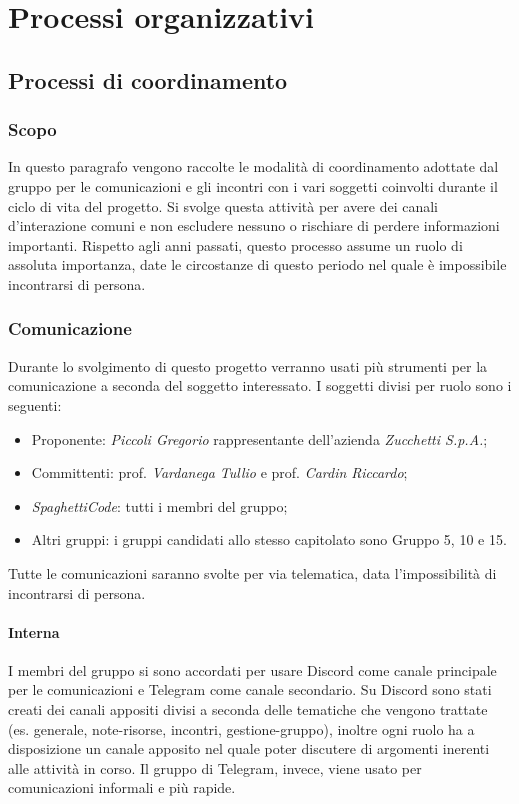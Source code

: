 \section{Processi organizzativi}
\label{sec:processi_organizativi}

\subsection{Processi di coordinamento}

\subsubsection{Scopo}
In questo paragrafo vengono raccolte le modalità di coordinamento adottate dal gruppo per le comunicazioni e gli 
incontri con i vari soggetti coinvolti durante il ciclo di vita del progetto. Si svolge questa attività per avere 
dei canali d'interazione comuni e non escludere nessuno o rischiare di perdere informazioni importanti. Rispetto 
agli anni passati, questo processo assume un ruolo di assoluta importanza, date le circostanze di questo periodo 
nel quale è impossibile incontrarsi di persona.

\subsubsection{Comunicazione}
Durante lo svolgimento di questo progetto verranno usati più strumenti per la comunicazione a seconda del soggetto 
interessato. I soggetti divisi per ruolo sono i seguenti:
\begin{itemize}
    \item Proponente: \emph{Piccoli Gregorio} rappresentante dell'azienda \emph{Zucchetti S.p.A.};
    \item Committenti: prof. \emph{Vardanega Tullio} e prof. \emph{Cardin Riccardo};
    \item \emph{SpaghettiCode}: tutti i membri del gruppo;
    \item Altri gruppi: i gruppi candidati allo stesso capitolato sono Gruppo 5, 10 e 15.
\end{itemize}
Tutte le comunicazioni saranno svolte per via telematica, data l'impossibilità di incontrarsi di persona.

\paragraph{Interna}

I membri del gruppo si sono accordati per usare Discord come canale principale per le comunicazioni e Telegram 
come canale secondario. Su Discord sono stati creati dei canali appositi divisi a seconda delle tematiche che 
vengono trattate (es. generale, note-risorse, incontri, gestione-gruppo), inoltre ogni ruolo ha a disposizione 
un canale apposito nel quale poter discutere di argomenti inerenti alle attività in corso. Il gruppo di 
Telegram, invece, viene usato per comunicazioni informali e più rapide.

